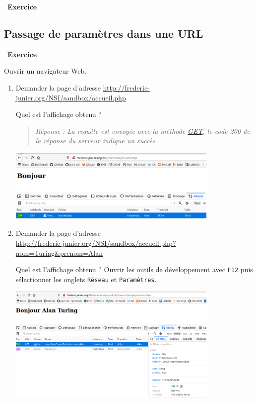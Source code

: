 \documentclass[
  11pt,
]{article}
\newcommand{\passthrough}[1]{#1}
\newcounter{exo}
\newenvironment{exercice}[1]
{\par \medskip   \addtocounter{exo}{1} \noindent  
\begin{bclogo}[arrondi =0.1,   noborder = true, logo=\bccrayon, marge=4]{~\textbf{Exercice} \textbf{\theexo} {\itshape #1} }  \par}
{
\end{bclogo}
 \par \bigskip }
\newcounter{def}
\begin{document}
\begin{exercice}{}
\end{exercice}

\hypertarget{passage-de-paramuxe8tres-dans-une-url}{%
\subsection{Passage de paramètres dans une
URL}\label{passage-de-paramuxe8tres-dans-une-url}}

\begin{exercice}{}

Ouvrir un navigateur Web.

\begin{enumerate}
\def\labelenumi{\arabic{enumi}.}
\item
  Demander la page d'adresse
  \href{https://frederic-junier.org/NSI/sandbox/accueil.php}{http://frederic-junier.org/NSI/sandbox/accueil.php}

  Quel est l'affichage obtenu ?

  \begin{quote}
  \emph{Réponse : La requête est envoyée avec la méthode \url{GET}, le
  code 200 de la réponse du serveur indique un succès}
  \end{quote}

  \includegraphics[width=0.8\textwidth,height=\textheight]{images/bonjour.png}\\
\item
  Demander la page d'adresse\\
  \href{https://frederic-junier.org/NSI/sandbox/accueil.php?nom=Turing\&prenom=Alan}{http://frederic-junier.org/NSI/sandbox/accueil.php?nom=Turing\&prenom=Alan}

  Quel est l'affichage obtenu ? Ouvrir les outils de développement avec
  \passthrough{\lstinline!F12!} puis sélectionner les onglets
  \passthrough{\lstinline!Réseau!} et
  \passthrough{\lstinline!Paramètres!}.

  \includegraphics[width=0.8\textwidth,height=\textheight]{images/bonjour_get.png}\\
\end{enumerate}


\end{exercice}
\end{document}
